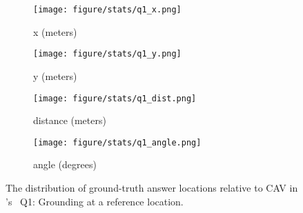 \begin{figure}[!t]
        \centering
        \begin{subfigure}[t]{0.23\textwidth}
            \centering 
            \texttt{[image: figure/stats/q1\_x.png]}
            \vspace{-20pt}
            \caption[]%
            {{x (meters)}}    
        \end{subfigure}
        \hfill
        \begin{subfigure}[t]{0.23\textwidth}  
            \centering 
            \texttt{[image: figure/stats/q1\_y.png]}
            \vspace{-20pt}
            \caption[]%
            {{y (meters)}}
        \end{subfigure}

        \begin{subfigure}[t]{0.23\textwidth}
            \centering 
            \texttt{[image: figure/stats/q1\_dist.png]}
            \vspace{-20pt}
            \caption[]%
            {{distance (meters)}}
        \end{subfigure}
        \hfill
        \begin{subfigure}[t]{0.23\textwidth}
            \centering 
            \texttt{[image: figure/stats/q1\_angle.png]}
            \vspace{-20pt}
            \caption[]%
            {{angle (degrees)}}
        \end{subfigure}
        \hfill
        
        \vspace{-10pt}
        \caption[]
        {
        The distribution of ground-truth answer locations relative to CAV in \namedataset's \namevsplit~Q1: Grounding at a reference location. 
        } 
        \label{fig:stats_v2v_q1}
        \vspace{-10pt}
\end{figure}


